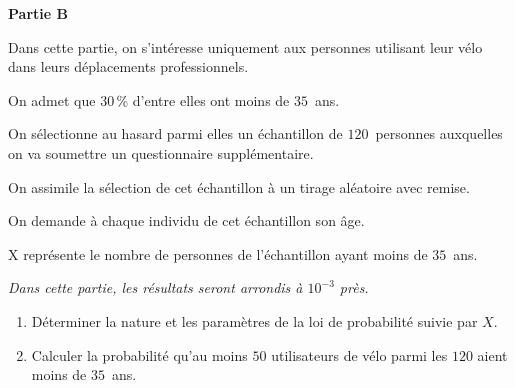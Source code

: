 \textbf{Partie B}

\medskip

Dans cette partie, on s'intéresse uniquement aux personnes utilisant leur vélo dans leurs déplacements professionnels.

\medskip

On admet que 30\,\% d'entre elles ont moins de $35$~ans.

On sélectionne au hasard parmi elles un échantillon de $120$~personnes auxquelles on va soumettre un questionnaire supplémentaire. 

On assimile la sélection de cet échantillon à un tirage aléatoire avec remise.

\medskip

On demande à chaque individu de cet échantillon son âge.

\medskip

X représente le nombre de personnes de l'échantillon ayant moins de $35$~ans.

\medskip

\emph{Dans cette partie, les résultats seront arrondis à $10^{-3}$ près.}

\begin{enumerate}
	\item Déterminer la nature et les paramètres de la loi de probabilité suivie par $X$.
	\item Calculer la probabilité qu'au moins $50$ utilisateurs de vélo parmi les $120$ aient moins de $35$~ans.
\end{enumerate}
